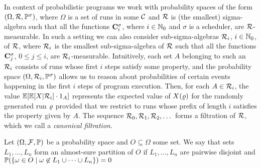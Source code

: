 In context of probabilistic programs we work with probability 
spaces of the form $(\Omega,\mathcal{R},\mathbb{P}^\sigma)$, where $\Omega$ is a 
set of runs in some $\mathcal{C}$ and $\mathcal{R}$ is (the smallest) sigma-algebra 
such that all the functions $\mathbf{C}^{\sigma}_{i}$, where $i\in \mathbb{N}_0$ and 
$\sigma$ is a scheduler, are $\mathcal{R}$-measurable. In such a setting we can 
also consider sub-sigma-algebras $\mathcal{R}_i$, $i\in \mathbb{N}_0$, of 
$\mathcal{R}$, where $\mathcal{R}_i$ is the smallest sub-sigma-algebra of 
$\mathcal{R}$ such that all the functions $\mathbf{C}^{\sigma}_{j}$, $0\leq j \leq 
i$, are $\mathcal{R}_i$-measurable. Intuitively, each set $A$ belonging to such 
an $\mathcal{R}_i$ consists of runs whose first $i$ steps satisfy some 
property, and the probability space $(\Omega,\mathcal{R}_i,\mathbb{P}^\sigma)$ 
allows us to reason about probabilities of certain events happening in the 
first 
$i$ steps of program execution. 
Then, for each $A\in \mathcal{R}_i$, the 
value $\mathbb{E}[\mathbb{E}[X|\mathcal{R}_i]\cdot 1_A]$ represents the expected value of 
$X(\varrho)$ for the randomly generated run $\varrho$ provided that we restrict to 
runs whose
prefix of length $i$ satisfies the property given by $A$. 
The sequence $\mathcal{R}_0,\mathcal{R}_1,\mathcal{R}_2,\dots$ forms a 
filtration of $\mathcal{R}$, which we call a \emph{canonical filtration}.

\begin{definition}
Let $(\Omega,\mathcal{F},\mathbb{P})$ be a probability space and $O\subseteq \Omega$ some set.
 We say that sets $L_1,\dots,L_n$ form an almost-sure partition of $O$ if $L_1,\dots,L_n$ are pairwise disjoint and $\mathbb{P}(\{\omega\in O\mid \omega \not \in L_1\cup\dots \cup L_n\})=0$
\end{definition}

